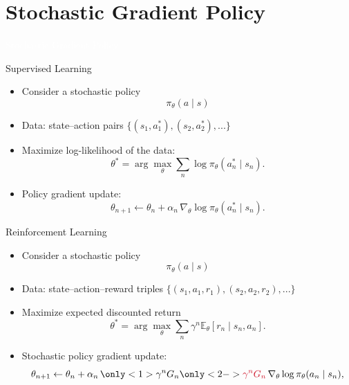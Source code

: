 \documentclass[11pt,table]{beamer}
\begin{document}
\section{Stochastic Gradient Policy}
{
\begin{frame}
\centering
\Huge
\textcolor{white}{Stochastic Gradient Policy}
\thispagestyle{empty}
\end{frame}
}


\begin{frame}{Supervised Learning}
  \begin{itemize}
    \item Consider a stochastic policy
  \[
    \pi_\theta(a\mid s) 
  \]
		\item Data: state–action pairs $\{(s_1,a_1^*),(s_2,a_2^*),...\}$
    \item Maximize log-likelihood of the data:
      \[
        \theta^* = \arg\max_\theta \sum_n \log \pi_\theta(a_n^*\mid s_n).
      \]
    \item Policy gradient update:
      \[
        \theta_{n+1} \leftarrow \theta_n
        + \alpha_n \,\nabla_\theta \log \pi_\theta(a_n^*\mid s_n).
      \]
  \end{itemize}
\end{frame}

\begin{frame}{Reinforcement Learning}
  \begin{itemize}
	    \item Consider a stochastic policy
  \[
    \pi_\theta(a\mid s) 
  \]
    \item Data: state–action–reward triples $\{(s_1,a_1,r_1),(s_2,a_2,r_2),...\}$
    \item Maximize expected discounted return
      \[
        \theta^*=\arg\max_\theta\sum_{n} \gamma^n \mathbb{E}_\theta[r_n \mid s_n,a_n].
      \]
    \item Stochastic policy gradient update:
      \[
        \theta_{n+1} \leftarrow \theta_n
        + \alpha_n \,\only<1>{\gamma^n G_n}\only<2->{\textcolor{red1}{\gamma^n G_n}} \,\nabla_\theta \log \pi_\theta(a_n\mid s_n),
      \]
  \end{itemize}
\end{frame}
\end{document}
